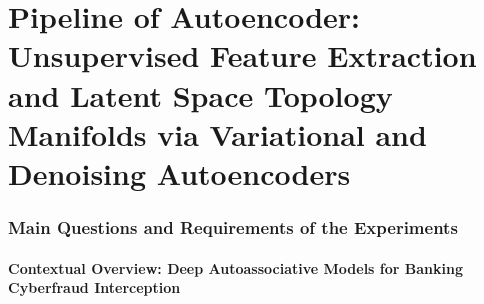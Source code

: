 



\captionsetup{font=small, labelfont=bf, width=\textwidth}

\setcounter{secnumdepth}{3}




% 



\graphicspath{{images/AE/}{images/}}

\chapter{Pipeline of Autoencoder: Unsupervised Feature Extraction and Latent Space Topology Manifolds via Variational and Denoising Autoencoders}

\subsection{Main Questions and Requirements of the Experiments}

\subsubsection{Contextual Overview: Deep Autoassociative Models for Banking Cyberfraud Interception}

